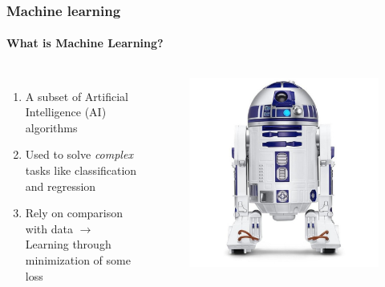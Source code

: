 \documentclass[aspectratio=43]{beamer}
\begin{document}
\begin{frame}

	\frametitle{Machine learning}
	\framesubtitle{What is Machine Learning?}
	\begin{columns}
		
		
		\begin{enumerate}
			\item A subset of Artificial Intelligence (AI) algorithms 
			\item Used to solve \textit{complex} tasks like classification and regression
			\item Rely on comparison with data $\longrightarrow$ {\color{red}Learning} through minimization of some loss
		\end{enumerate}
		
		\begin{figure}[!htb]
			\includegraphics[width = \linewidth]{plots/r2d2.jpeg}
		\end{figure}
	
	\end{columns}

\end{frame}
\end{document}
